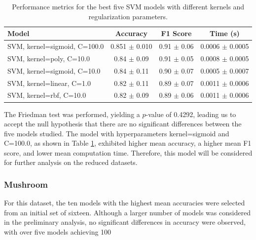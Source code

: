 \begin{table}[h!]
\centering
\begin{tabular}{|l|c|c|c|}
\hline
\textbf{Model} & \textbf{Accuracy} & \textbf{F1 Score} & \textbf{Time (s)} \\
\hline
SVM, kernel=sigmoid, C=100.0 & 0.851 $\pm$ 0.010 & 0.91 $\pm$ 0.06 & 0.0006 $\pm$ 0.0005 \\
\hline
SVM, kernel=poly, C=10.0     & 0.84 $\pm$ 0.09 & 0.91 $\pm$ 0.05 & 0.0008 $\pm$ 0.0005 \\
\hline
SVM, kernel=sigmoid, C=10.0  & 0.84 $\pm$ 0.11 & 0.90 $\pm$ 0.07 & 0.0005 $\pm$ 0.0007 \\
\hline
SVM, kernel=linear, C=1.0    & 0.82 $\pm$ 0.11 & 0.89 $\pm$ 0.07 & 0.0011 $\pm$ 0.0006 \\
\hline
SVM, kernel=rbf, C=10.0      & 0.82 $\pm$ 0.09 & 0.89 $\pm$ 0.06 & 0.0011 $\pm$ 0.0006 \\
\hline
\end{tabular}
\caption{Performance metrics for the best five SVM models with different kernels and regularization parameters.}
\label{tab:svm_metrics}
\end{table}

The Friedman test was performed, yielding a $p$-value of 0.4292, leading us to accept the null hypothesis that there are no significant differences between the five models studied. The model with hyperparameters kernel=sigmoid and C=100.0, as shown in Table \ref{tab:svm_metrics}, exhibited higher mean accuracy, a higher mean F1 score, and lower mean computation time. Therefore, this model will be considered for further analysis on the reduced datasets.

\subsubsection{Mushroom}

For this dataset, the ten models with the highest mean accuracies were selected from an initial set of sixteen. Although a larger number of models was considered in the preliminary analysis, no significant differences in accuracy were observed, with over five models achieving 100%

